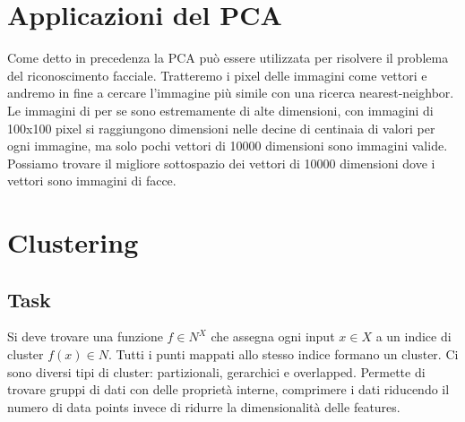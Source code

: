 \section{Applicazioni del PCA}
Come detto in precedenza la PCA pu\`o essere utilizzata per risolvere il problema del riconoscimento facciale. Tratteremo i pixel delle immagini come vettori e andremo in fine a cercare l'immagine pi\`u simile con una ricerca nearest-neighbor. Le immagini di per se sono estremamente di alte dimensioni, con immagini di 100x100 pixel si raggiungono dimensioni nelle decine di centinaia di valori per ogni immagine, ma solo pochi vettori di 10000 dimensioni sono immagini valide. Possiamo trovare il migliore sottospazio dei vettori di 10000 dimensioni dove i vettori sono immagini di facce.

\section{Clustering}
\subsection{Task}
Si deve trovare una funzione $f\in N^X$ che assegna ogni input $x\in X$ a un indice di cluster $f(x)\in N$.
Tutti i punti mappati allo stesso indice formano un cluster.
Ci sono diversi tipi di cluster: partizionali, gerarchici e overlapped.
Permette di trovare gruppi di dati con delle propriet\`a interne, comprimere i dati riducendo il numero di data points invece di ridurre la dimensionalit\`a delle features.	

